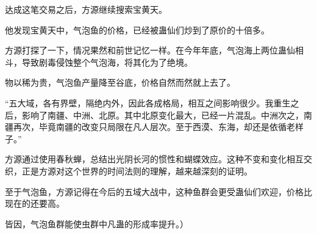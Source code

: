 \begin{this_body}
达成这笔交易之后，方源继续搜索宝黄天。

他发现宝黄天中，气泡鱼的价格，已经被蛊仙们炒到了原价的十倍多。

方源打探了一下，情况果然和前世记忆一样。在今年年底，气泡海上两位蛊仙相斗，导致剧毒侵蚀整个气泡海，将其化为了绝境。

物以稀为贵，气泡鱼产量降至谷底，价格自然而然就上去了。

“五大域，各有界壁，隔绝内外，因此各成格局，相互之间影响很少。我重生之后，影响了南疆、中洲、北原。其中北原变化最大，已经一片混乱。中洲次之，南疆再次，毕竟南疆的改变只局限在凡人层次。至于西漠、东海，却还是依循老样子。”

方源通过使用春秋蝉，总结出光阴长河的惯性和蝴蝶效应。这种不变和变化相互交织，正是方源对这个世界的时间法则的理解，越来越深刻的证明。

至于气泡鱼，方源记得在今后的五域大战中，这种鱼群会更受蛊仙们欢迎，价格比现在的还要高。

皆因，气泡鱼群能使虫群中凡蛊的形成率提升。）

\end{this_body}

